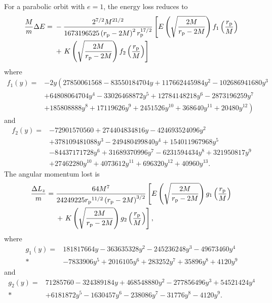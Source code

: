 For a parabolic orbit with $e = 1$, the energy loss reduces to
\begin{align}
\dfrac{M}{m} \Delta E = {} & -\dfrac{2^{7/2}M^{{21}/{2}}}{{1673196525 \left(r_\mathrm{p} - 2 M\right)^2 r_\mathrm{p}^{{17}/{2}}}} \left[E\left(\sqrt{\dfrac{2 M}{r_\mathrm{p} - 2 M}}\right) f_1\left(\dfrac{r_\mathrm{p}}{M}\right) \right. \nonumber \\*
 {} & + \left. K\left(\sqrt{\dfrac{2 M}{r_\mathrm{p} - 2 M}}\right) f_2\left(\dfrac{r_\mathrm{p}}{M}\right)\right]
\end{align}
where
\begin{align}
f_1(y) = {} & - 2 y \left(27850061568 - 83550184704 y + 117662445984 y^2 - 102686941680 y^3  \right. \nonumber \\ 
 {} & + \left. 64808064704 y^4 - 33026468872 y^5 + 12784148218 y^6 - 2873196259 y^7 \right. \nonumber \\ 
 {} & + \left. 185808888 y^8 + 17119626 y^9 + 2451526 y^{10} + 368640 y^{11} + 20480 y^{12} \right)
\end{align}
and
\begin{align}
f_2(y) = {} & -72901570560 + 274404834816 y - 424693524096 y^2 \nonumber \\ 
 {} & + \left. 378109481088 y^3 - 249480499840 y^4 + 154011967968 y^5 \right. \nonumber \\ 
 {} & - \left. 84437171728 y^6 + 31689370996 y^7 - 6231594434 y^8 + 321950817 y^9 \right. \nonumber \\ 
 {} & + \left. 27462280 y^{10} + 4073612 y^{11} + 696320 y^{12} + 40960 y^{13}. \right.
\end{align}
The angular momentum lost is
\begin{align}
\dfrac{\Delta L_{z}}{m} = {} & \dfrac{64 M^7}{24249225 {r_\mathrm{p}}^{{11}/{2}}\left(r_\mathrm{p} - 2 M \right)^{{3}/{2}}} \left[E\left(\sqrt{\dfrac{2 M}{r_\mathrm{p} - 2 M}}\right) g_1\left(\dfrac{r_\mathrm{p}}{M}\right) \right. \nonumber \\*
 {} & + \left.  K\left(\sqrt{\dfrac{2 M}{r_\mathrm{p} - 2 M}}\right) g_2\left(\dfrac{r_\mathrm{p}}{M}\right)\right],
\end{align}
where
\begin{align}
g_1(y) = {} & 181817664 y - 363635328 y^2 - 245236248 y^3 - 49673460 y^4  \nonumber \\*
 {} & - \left. 7833906 y^5 + 2016105 y^6 + 283252 y^7 + 35896 y^8 + 4120 y^9 \right.
\end{align}
and
\begin{align}
g_2(y) = {} & 71285760 - 324389184 y + 468548880 y^2 - 277856496 y^3 + 54521424 y^4 \nonumber \\*
 {} & + \left. 6181872 y^5 - 1630457 y^6 - 238086 y^7 - 31776 y^8 - 4120 y^9. \right.
\end{align}
